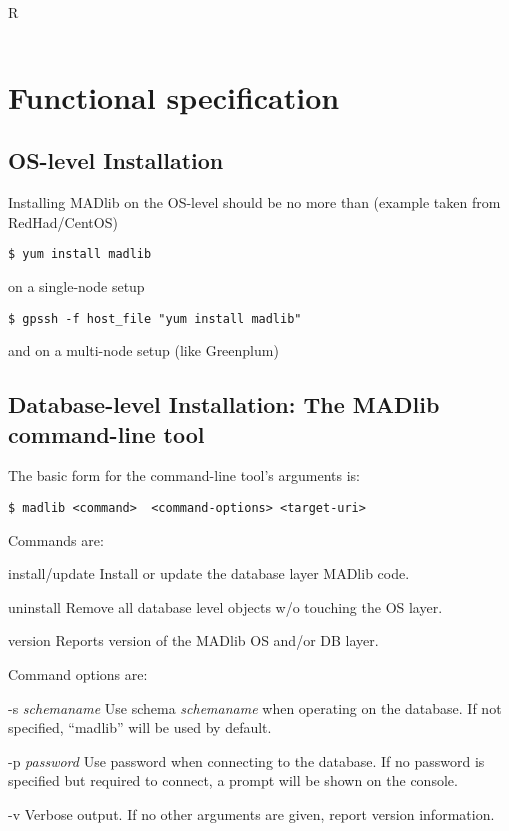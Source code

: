 \documentclass[11pt]{article}
\begin{document}
{\begin{mlreq}{R}
\begin{tabular}{|l|p{133mm}|}
\end{tabular}
\end{mlreq}

\ifx\pdfoutput\undefined %
\else
{}
\fi

\section{Functional specification}

\subsection{OS-level Installation}

	Installing MADlib on the OS-level should be no more than (example taken from RedHad/CentOS)
	\begin{lstlisting}
$ yum install madlib
	\end{lstlisting}
	on a single-node setup
	\begin{lstlisting}
$ gpssh -f host_file "yum install madlib"
	\end{lstlisting}
	and on a multi-node setup (like Greenplum)

\subsection{Database-level Installation: The MADlib command-line tool}


	The basic form for the command-line tool's arguments is:

	\begin{lstlisting}
$ madlib <command>  <command-options> <target-uri>
	\end{lstlisting}

\begin{description}
	\item Commands are:
	\begin{ttdescription}
		\item[install/update] Install or update the database layer MADlib code.
		\item[uninstall] Remove all database level objects w/o touching the OS layer.
		\item[version] Reports version of the MADlib OS and/or DB layer. 
	\end{ttdescription}

	\item Command options are:
	\begin{ttdescription}
		\item[-s \textit{schemaname}] Use schema \textit{schemaname} when operating on the database. If not specified, ``madlib'' will be used by default. 
		\item[-p \textit{password}] Use password  when connecting to the database. If no password is specified but required to connect, a prompt will be shown on the console.
		\item[-v] Verbose output. If no other arguments are given, report version information.
	\end{ttdescription}


\end{description}}
\end{document}
